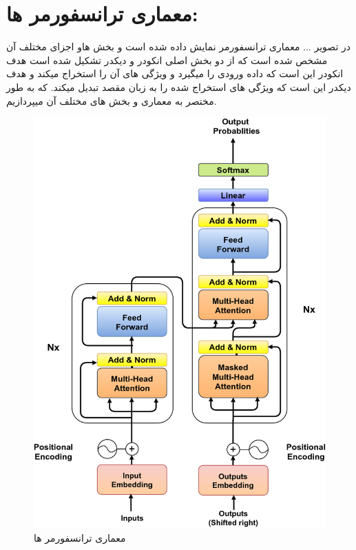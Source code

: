  \section{معماری ترانسفورمر ها:}
 
 در تصویر ... معماری ترانسفورمر نمایش داده شده است  و بخش هاو اجزای مختلف آن مشخص شده است که از دو بخش اصلی انکودر و دیکدر تشکیل شده است هدف انکودر این است که داده ورودی را میگیرد  و ویژگی های آن را استخراج میکند و هدف دیکدر این است که ویژگی های استخراج شده را به زبان مقصد تبدیل میکند. که به طور مختصر به معماری  و بخش های مختلف آن میپردازیم.
 
 \begin{figure}[h]
 	\centering
 	\begin{minipage}[b]{0.45\textwidth}
 		\centering
 		\includegraphics[width=\textwidth]{Transformer-model-architecture.png}
 		\caption{معماری ترانسفورمر ها}
 		\label{fig:transformer_architecture}
 	\end{minipage}
 	\hfill

 \end{figure}

